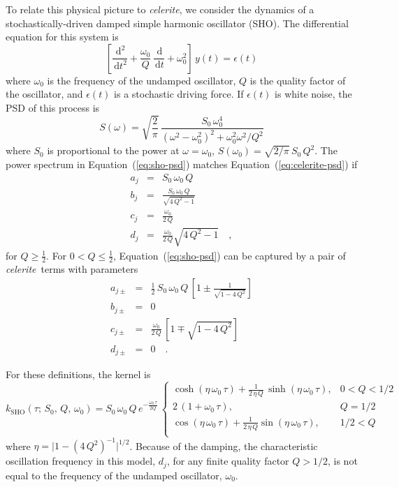 \documentclass[manuscript, letterpaper]{aastex6}
\newcommand{\celeriteterm}{\emph{celerite}}
\renewcommand{\eqref}[1]{\ref{eq:#1}}
\newcommand{\Eq}[1]{Equation~(\eqref{#1})}
\newcommand{\eq}[1]{\Eq{#1}}
\newcommand{\eqlabel}[1]{\label{eq:#1}}
\newcommand{\dd}{\ensuremath{\,\mathrm{d}}}
\begin{document}
To relate this physical picture to \celeriteterm, we consider the dynamics of a
stochastically-driven damped simple harmonic oscillator (SHO).
The differential equation for this system is
\begin{equation}
    \left[\frac{\dd^2}{\dd t^2} + \frac{\omega_0}{Q}\,\frac{\dd}{\dd t}
        + \omega_0^2\right]\, y(t) = \epsilon(t)
\end{equation}
where $\omega_0$ is the frequency of the undamped oscillator, $Q$ is the
quality factor of the oscillator, and $\epsilon(t)$ is a stochastic driving
force.
If $\epsilon(t)$ is white noise, the PSD of this process is
\citep{Anderson:1990}
\begin{equation}\eqlabel{sho-psd}
    S(\omega) = \sqrt{\frac{2}{\pi}}\,\frac{S_0\,\omega_0^4}
    {(\omega^2-\omega_0^2)^2 + \omega_0^2\omega^2/Q^2}
\end{equation}
where $S_0$ is proportional to the power at $\omega = \omega_0$, $S(\omega_0)
    = \sqrt{2/\pi}\,S_0\,Q^2$.
The power spectrum in \eq{sho-psd} matches \eq{celerite-psd} if
\begin{eqnarray}\eqlabel{sho-complex}
    a_j &=& S_0\,\omega_0\,Q \\
    b_j &=& \frac{S_0\,\omega_0\,Q}{\sqrt{4\,Q^2-1}} \nonumber\\
    c_j &=& \frac{\omega_0}{2\,Q} \nonumber\\
    d_j &=& \frac{\omega_0}{2\,Q} \sqrt{4\,Q^2-1} \quad, \nonumber
\end{eqnarray}
for $Q \ge \frac{1}{2}$.
For $0 < Q \le \frac{1}{2}$, \eq{sho-psd} can be captured by a pair of
\celeriteterm\
terms with parameters
\begin{eqnarray}\eqlabel{sho-real}
    a_{j\pm} &=& \frac{1}{2}\,S_0\,\omega_0\,Q\,\left[ 1 \pm
        \frac{1}{\sqrt{1-4\,Q^2}}\right] \\
    b_{j\pm} &=& 0 \nonumber\\
    c_{j\pm} &=& \frac{\omega_0}{2\,Q}\,\left[1 \mp \sqrt{1-4\,Q^2}\right]
    \nonumber\\
    d_{j\pm} &=& 0 \quad. \nonumber
\end{eqnarray}

For these definitions, the kernel is
\begin{equation}\eqlabel{sho-kernel}
    k_\mathrm{SHO}(\tau;\,S_0,\,Q,\,\omega_0) =
    S_0\,\omega_0\,Q\,e^{-\frac{\omega_0\,\tau}{2Q}}\,
    \begin{cases}
        \cosh{(\eta\,\omega_0\,\tau)} +
        \frac{1}{2\,\eta\,Q}\,\sinh{(\eta\,\omega_0\,\tau)}, & 0 < Q < 1/2 \\
        2\,(1+\omega_0\,\tau),                               & Q = 1/2     \\
        \cos{(\eta\,\omega_0\,\tau)} +
        \frac{1}{2\,\eta\,Q} \sin{(\eta\,\omega_0\,\tau)},   & 1/2 < Q     \\
    \end{cases}
\end{equation}
where $\eta = \vert 1-(4\,Q^2)^{-1}\vert^{1/2}$.
Because of the damping, the characteristic oscillation frequency in this
model, $d_j$, for any finite quality factor $Q > 1/2$, is not equal to the
frequency of the undamped oscillator, $\omega_0$.
\end{document}
